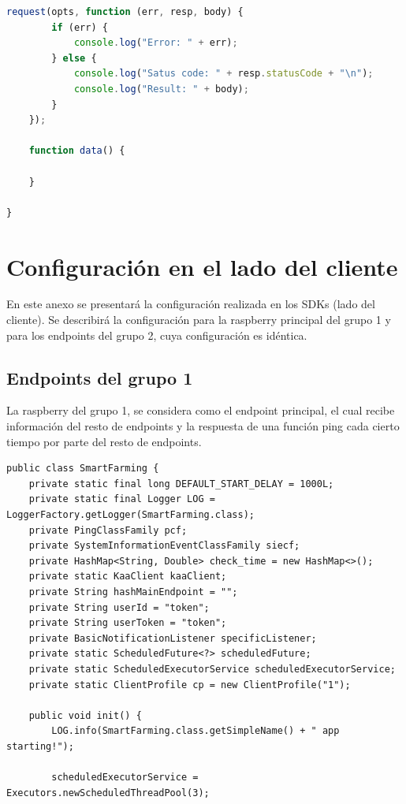 \documentclass[12pt, twoside]{book}
\begin{document}
\begin{appendices}
\begin{lstlisting}[language=JavaScript]
    request(opts, function (err, resp, body) {
        if (err) {
            console.log("Error: " + err);
        } else {
            console.log("Satus code: " + resp.statusCode + "\n");
            console.log("Result: " + body);
        }
    });

    function data() {

    }

}

\end{lstlisting}
\chapter{Configuración en el lado del cliente}
En este anexo se presentará la configuración realizada en los SDKs (lado del cliente). Se describirá la configuración para la raspberry principal del grupo 1 y para los endpoints del grupo 2, cuya configuración es idéntica.
\section{Endpoints del grupo 1}
La raspberry del grupo 1, se considera como el endpoint principal, el cual recibe información del resto de endpoints y la respuesta de una función ping cada cierto tiempo por parte del resto de endpoints.\\
\begin{lstlisting}
public class SmartFarming {
	private static final long DEFAULT_START_DELAY = 1000L;
	private static final Logger LOG = LoggerFactory.getLogger(SmartFarming.class);
	private PingClassFamily pcf;
	private SystemInformationEventClassFamily siecf;
	private HashMap<String, Double> check_time = new HashMap<>();
	private static KaaClient kaaClient;
	private String hashMainEndpoint = "";
	private String userId = "token";
	private String userToken = "token";
	private BasicNotificationListener specificListener;
	private static ScheduledFuture<?> scheduledFuture;
	private static ScheduledExecutorService scheduledExecutorService;
	private static ClientProfile cp = new ClientProfile("1");

	public void init() {
		LOG.info(SmartFarming.class.getSimpleName() + " app starting!");

		scheduledExecutorService = Executors.newScheduledThreadPool(3);


\end{lstlisting}
\end{appendices}
\end{document}
